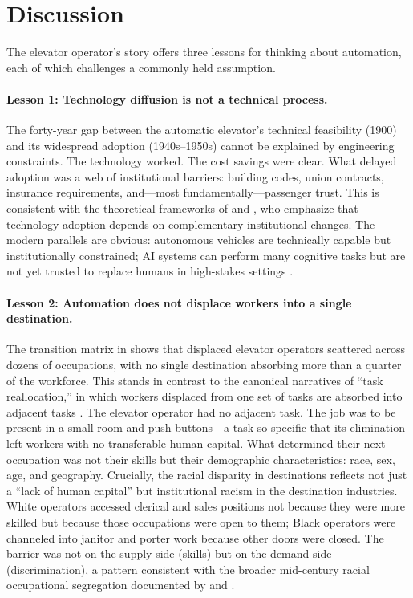 \documentclass[12pt]{article}
\begin{document}

\section{Discussion} \label{sec:discussion}

The elevator operator's story offers three lessons for thinking about automation, each of which challenges a commonly held assumption.

\paragraph{Lesson 1: Technology diffusion is not a technical process.} The forty-year gap between the automatic elevator's technical feasibility (1900) and its widespread adoption (1940s--1950s) cannot be explained by engineering constraints. The technology worked. The cost savings were clear. What delayed adoption was a web of institutional barriers: building codes, union contracts, insurance requirements, and---most fundamentally---passenger trust. This is consistent with the theoretical frameworks of \citet{david1990} and \citet{comin2010}, who emphasize that technology adoption depends on complementary institutional changes. The modern parallels are obvious: autonomous vehicles are technically capable but institutionally constrained; AI systems can perform many cognitive tasks but are not yet trusted to replace humans in high-stakes settings \citep{brynjolfsson2017, noy2023}.

\paragraph{Lesson 2: Automation does not displace workers into a single destination.} The transition matrix in  shows that displaced elevator operators scattered across dozens of occupations, with no single destination absorbing more than a quarter of the workforce. This stands in contrast to the canonical narratives of ``task reallocation,'' in which workers displaced from one set of tasks are absorbed into adjacent tasks \citep{acemoglu2019, autor2024}. The elevator operator had no adjacent task. The job was to be present in a small room and push buttons---a task so specific that its elimination left workers with no transferable human capital. What determined their next occupation was not their skills but their demographic characteristics: race, sex, age, and geography. Crucially, the racial disparity in destinations reflects not just a ``lack of human capital'' but institutional racism in the destination industries. White operators accessed clerical and sales positions not because they were more skilled but because those occupations were open to them; Black operators were channeled into janitor and porter work because other doors were closed. The barrier was not on the supply side (skills) but on the demand side (discrimination), a pattern consistent with the broader mid-century racial occupational segregation documented by \citet{derenoncourt2022} and \citet{collins2022}.
\end{document}
